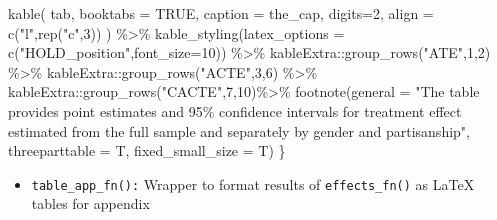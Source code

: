 \documentclass[
]{article}
\newenvironment{Shaded}{\begin{snugshade}}{\end{snugshade}}
\newcommand{\AttributeTok}[1]{\textcolor[rgb]{0.77,0.63,0.00}{#1}}
\newcommand{\ConstantTok}[1]{\textcolor[rgb]{0.00,0.00,0.00}{#1}}
\newcommand{\DecValTok}[1]{\textcolor[rgb]{0.00,0.00,0.81}{#1}}
\newcommand{\FunctionTok}[1]{\textcolor[rgb]{0.00,0.00,0.00}{#1}}
\newcommand{\NormalTok}[1]{#1}
\newcommand{\SpecialCharTok}[1]{\textcolor[rgb]{0.00,0.00,0.00}{#1}}
\newcommand{\StringTok}[1]{\textcolor[rgb]{0.31,0.60,0.02}{#1}}
\providecommand{\tightlist}{%
  \setlength{\itemsep}{0pt}\setlength{\parskip}{0pt}}
\begin{document}
\begin{Shaded}
\begin{Highlighting}[]
  \FunctionTok{kable}\NormalTok{(}
\NormalTok{    tab, }
    \AttributeTok{booktabs =} \ConstantTok{TRUE}\NormalTok{, }
    \AttributeTok{caption =}\NormalTok{ the\_cap, }
    \AttributeTok{digits=}\DecValTok{2}\NormalTok{,}
    \AttributeTok{align =} \FunctionTok{c}\NormalTok{(}\StringTok{"l"}\NormalTok{,}\FunctionTok{rep}\NormalTok{(}\StringTok{"c"}\NormalTok{,}\DecValTok{3}\NormalTok{))}
\NormalTok{  ) }\SpecialCharTok{\%\textgreater{}\%} 
    \FunctionTok{kable\_styling}\NormalTok{(}\AttributeTok{latex\_options =} \FunctionTok{c}\NormalTok{(}\StringTok{"HOLD\_position"}\NormalTok{,}\AttributeTok{font\_size=}\DecValTok{10}\NormalTok{)) }\SpecialCharTok{\%\textgreater{}\%}
\NormalTok{    kableExtra}\SpecialCharTok{::}\FunctionTok{group\_rows}\NormalTok{(}\StringTok{"ATE"}\NormalTok{,}\DecValTok{1}\NormalTok{,}\DecValTok{2}\NormalTok{) }\SpecialCharTok{\%\textgreater{}\%}
\NormalTok{    kableExtra}\SpecialCharTok{::}\FunctionTok{group\_rows}\NormalTok{(}\StringTok{"ACTE"}\NormalTok{,}\DecValTok{3}\NormalTok{,}\DecValTok{6}\NormalTok{) }\SpecialCharTok{\%\textgreater{}\%}
\NormalTok{    kableExtra}\SpecialCharTok{::}\FunctionTok{group\_rows}\NormalTok{(}\StringTok{"CACTE"}\NormalTok{,}\DecValTok{7}\NormalTok{,}\DecValTok{10}\NormalTok{)}\SpecialCharTok{\%\textgreater{}\%}
    \FunctionTok{footnote}\NormalTok{(}\AttributeTok{general =} \StringTok{"The table provides point estimates and 95\% confidence intervals for treatment effect estimated from the full sample and separately by gender and partisanship"}\NormalTok{,}
             \AttributeTok{threeparttable =}\NormalTok{ T,}
             \AttributeTok{fixed\_small\_size =}\NormalTok{ T)}
\NormalTok{\}}
\end{Highlighting}
\end{Shaded}

\begin{itemize}
\tightlist
\item
  \texttt{table\_app\_fn():} Wrapper to format results of
  \texttt{effects\_fn()} as LaTeX tables for appendix
\end{itemize}
\end{document}
